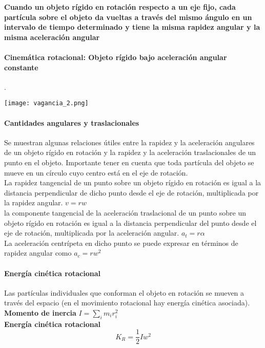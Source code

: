 \documentclass[10pt]{article}
\begin{document}
\textbf{Cuando un objeto rígido en rotación respecto a un eje fijo, cada partícula sobre el objeto da vueltas a través del mismo ángulo en un intervalo de tiempo determinado y tiene la misma rapidez angular y la misma aceleración angular}

\paragraph{Cinemática rotacional: Objeto rígido bajo aceleración angular constante}.

\texttt{[image: vagancia\_2.png]}\\

\paragraph{Cantidades angulares y traslacionales}

Se muestran algunas relaciones útiles entre la rapidez y la aceleración angulares de un objeto rígido en rotación y la rapidez y la aceleración traslacionales de un punto en el objeto. Importante tener en cuenta que  toda partícula del objeto se mueve
en un círculo cuyo centro está en el eje de rotación.\\
\linebreak
La rapidez tangencial de un punto sobre un objeto rígido en rotación es igual a la distancia perpendicular de dicho punto desde el eje de rotación, multiplicada por la rapidez angular. $v = rw$\\
\linebreak
la componente tangencial de la aceleración traslacional de un punto sobre un objeto rígido en rotación es igual a la distancia perpendicular del punto desde el eje de rotación, multiplicada por la aceleración angular. $a_t = r\alpha$\\
\linebreak
La aceleración centrípeta en dicho punto se puede expresar en términos de rapidez angular como $a_c = rw^2$

\paragraph{Energía cinética rotacional}
Las partículas individuales que conforman el objeto en rotación se mueven a través del espacio (en el movimiento rotacional hay energía cinética asociada).\\
\linebreak
\textbf{Momento de inercia} $I = \sum_i m_i r_i^2$\\
\linebreak
\textbf{Energía cinética rotacional}
\begin{equation*}
	K_R = \dfrac{1}{2}Iw^2
\end{equation*}
\end{document}
